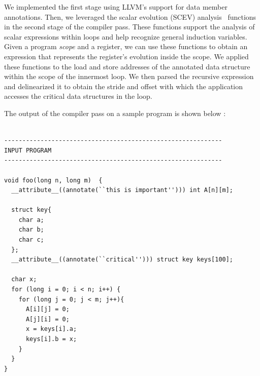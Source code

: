 \documentclass[letterpaper]{article}
\begin{document}
We implemented the first stage using LLVM's support for data member annotations.
Then, we leveraged the scalar evolution (SCEV) analysis~\cite{llvm15} functions
in the second stage of the compiler pass.
These functions support the analysis of scalar expressions within loops and
help recognize general induction variables.
Given a program \textit{scope} and a register, we can use these functions to
obtain an expression that represents the register's evolution inside the scope.
We applied these functions to the load and store addresses of the annotated 
data structure within the scope of the innermost loop. We then parsed
the recursive expression and delinearized it to obtain the stride and offset
with which the application accesses the critical data structures in the loop.

The output of the compiler pass on a sample program is shown below :

\begin{lstlisting}[caption={Sample Input Program},label={lst:input}]

------------------------------------------------------------
INPUT PROGRAM
------------------------------------------------------------

void foo(long n, long m)  {
  __attribute__((annotate(``this is important''))) int A[n][m];
  
  struct key{
    char a;
    char b;
    char c;
  };
  __attribute__((annotate(``critical''))) struct key keys[100];

  char x;
  for (long i = 0; i < n; i++) {
    for (long j = 0; j < m; j++){
      A[i][j] = 0;
      A[j][i] = 0;
      x = keys[i].a;
      keys[i].b = x;
    }
  }
}
\end{lstlisting}
\end{document}
